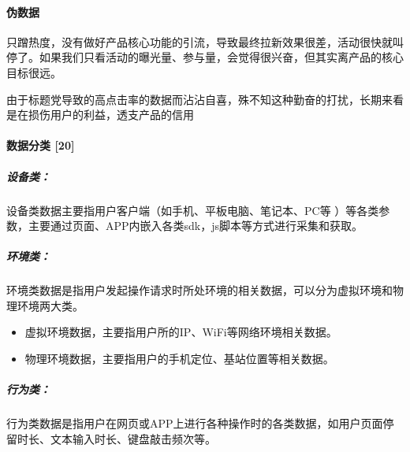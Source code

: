 \documentclass[letterpaper,11pt,english]{sphinxmanual}
\begin{document}
%
\begin{footnote}[311]\sphinxAtStartFootnote
{}
%
\end{footnote}


\paragraph{伪数据}
\label{\detokenize{chapter_idea/data:id4}}
只蹭热度，没有做好产品核心功能的引流，导致最终拉新效果很差，活动很快就叫停了。如果我们只看活动的曝光量、参与量，会觉得很兴奋，但其实离产品的核心目标很远。

由于标题党导致的高点击率的数据而沾沾自喜，殊不知这种勤奋的打扰，长期来看是在损伤用户的利益，透支产品的信用%
\begin{footnote}[312]\sphinxAtStartFootnote
{}
%
\end{footnote}


\paragraph{数据分类 {[}20{]}}
\label{\detokenize{chapter_idea/data:id5}}

\subparagraph{设备类：}
\label{\detokenize{chapter_idea/data:id6}}
设备类数据主要指用户客户端（如手机、平板电脑、笔记本、PC等
）等各类参数，主要通过页面、APP内嵌入各类sdk，js脚本等方式进行采集和获取。


\subparagraph{环境类：}
\label{\detokenize{chapter_idea/data:id7}}
环境类数据是指用户发起操作请求时所处环境的相关数据，可以分为虚拟环境和物理环境两大类。
\begin{itemize}
\item {} 
虚拟环境数据，主要指用户所的IP、WiFi等网络环境相关数据。

\item {} 
物理环境数据，主要指用户的手机定位、基站位置等相关数据。

\end{itemize}


\subparagraph{行为类：}
\label{\detokenize{chapter_idea/data:id8}}
行为类数据是指用户在网页或APP上进行各种操作时的各类数据，如用户页面停留时长、文本输入时长、键盘敲击频次等。
\end{document}
